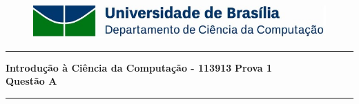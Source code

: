 \documentclass[a4paper, 12pt]{article}
\begin{document}
\begin{figure}[H]
	\includegraphics[scale=0.9]{UnB_CiC_Logo.jpg}
\end{figure}
\noindent\rule{\textwidth}{0.4pt}
\begin{center}
	\textbf{{\Large Introdução à Ciência da Computação - 113913}} \newline \newline
	\textbf{{\large Prova 1} \\
	\vspace{9pt}
	{\large Questão A}} \\
	\noindent\rule{\textwidth}{0.4pt}
	\newline
\end{center}
\end{document}
